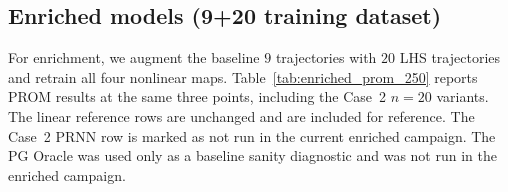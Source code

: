 \documentclass[11pt]{article}
\begin{document}
\subsection{Enriched models (9+20 training dataset)}
\label{sec:enriched_prom_250}

For enrichment, we augment the baseline $9$ trajectories with $20$ LHS trajectories and retrain all four nonlinear maps. Table~\ref{tab:enriched_prom_250} reports PROM results at the same three points, including the Case~2 $n=20$ variants. The linear reference rows are unchanged and are included for reference. The Case~2 PRNN row is marked as not run in the current enriched campaign. The PG Oracle was used only as a baseline sanity diagnostic and was not run in the enriched campaign.

\begin{table}[H]
\centering
\caption{Enriched PROM results on $250\times250$ (trained with $9+20$ trajectories, $n_{\mathrm{tot}}=151$), including Case~2 variants for $n=10$ and $n=20$.}
\label{tab:enriched_prom_250}
\end{table}
\end{document}
